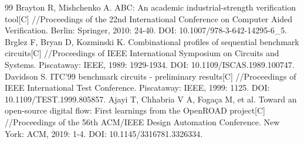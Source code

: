 \documentclass[twocolumn,10pt,fontset=windows]{ctexart}
\begin{document}
\begin{thebibliography}{99}
 Brayton R, Mishchenko A. ABC: An academic industrial-strength verification tool[C] //Proceedings of the 22nd International Conference on Computer Aided Verification. Berlin: Springer, 2010: 24-40. DOI: 10.1007/978-3-642-14295-6\_5.
 Brglez F, Bryan D, Kozminski K. Combinational profiles of sequential benchmark circuits[C] //Proceedings of IEEE International Symposium on Circuits and Systems. Piscataway: IEEE, 1989: 1929-1934. DOI: 10.1109/ISCAS.1989.100747.
 Davidson S. ITC'99 benchmark circuits - preliminary results[C] //Proceedings of IEEE International Test Conference. Piscataway: IEEE, 1999: 1125. DOI: 10.1109/TEST.1999.805857.
 Ajayi T, Chhabria V A, Fogaça M, et al. Toward an open-source digital flow: First learnings from the OpenROAD project[C] //Proceedings of the 56th ACM/IEEE Design Automation Conference. New York: ACM, 2019: 1-4. DOI: 10.1145/3316781.3326334.
\end{thebibliography}
\end{document}
